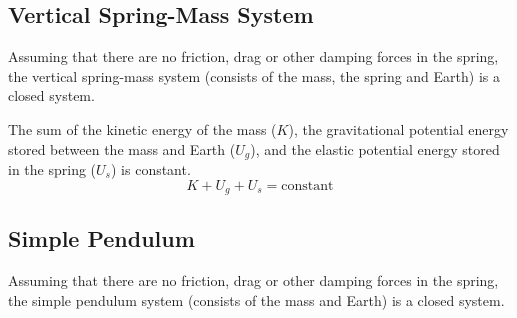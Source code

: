 \documentclass[11pt]{article}
\begin{document}
\subsection{Vertical Spring-Mass System}
Assuming that there are no friction, drag or other damping forces in the
spring, the vertical spring-mass system (consists of the mass, the spring
and Earth) is a closed system.
\begin{figure}[ht]
  \centering
\end{figure}
The sum of the kinetic energy of the mass ($K$), the gravitational potential
energy stored between the mass and Earth ($U_g$), and the elastic potential
energy stored in the spring ($U_s$) is constant.
\begin{equation}
  K + U_g + U_s=\text{constant}
\end{equation}



\subsection{Simple Pendulum}
Assuming that there are no friction, drag or other damping forces in the
spring, the simple pendulum system (consists of the mass and Earth) is a
closed system.
%
    
\end{document}
